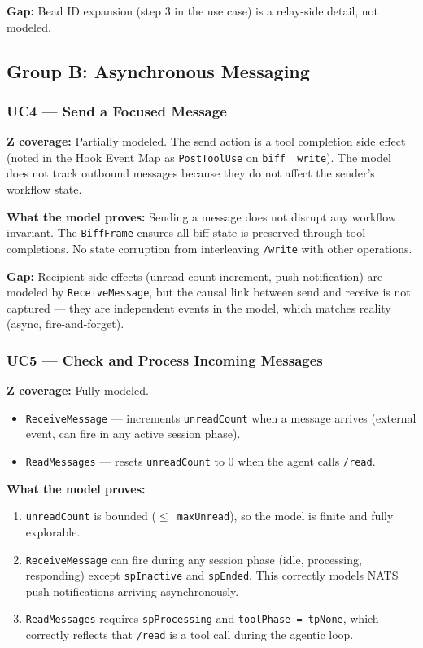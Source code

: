 \documentclass[a4paper,10pt,fleqn]{article}
\begin{document}
\textbf{Gap:} Bead ID expansion (step 3 in the use case) is a relay-side
detail, not modeled.

\subsection{Group B: Asynchronous Messaging}

\subsubsection{UC4 --- Send a Focused Message}

\textbf{Z coverage:} Partially modeled. The send action is a tool
completion side effect (noted in the Hook Event Map as
\texttt{PostToolUse} on \texttt{biff\_\_write}). The model does not
track outbound messages because they do not affect the sender's
workflow state.

\textbf{What the model proves:} Sending a message does not disrupt
any workflow invariant. The \texttt{BiffFrame} ensures all biff state
is preserved through tool completions. No state corruption from
interleaving \texttt{/write} with other operations.

\textbf{Gap:} Recipient-side effects (unread count increment, push
notification) are modeled by \texttt{ReceiveMessage}, but the causal
link between send and receive is not captured --- they are independent
events in the model, which matches reality (async, fire-and-forget).

\subsubsection{UC5 --- Check and Process Incoming Messages}

\textbf{Z coverage:} Fully modeled.

\begin{itemize}
  \item \texttt{ReceiveMessage} --- increments \texttt{unreadCount} when
    a message arrives (external event, can fire in any active session phase).
  \item \texttt{ReadMessages} --- resets \texttt{unreadCount} to 0 when
    the agent calls \texttt{/read}.
\end{itemize}

\textbf{What the model proves:}

\begin{enumerate}
  \item \texttt{unreadCount} is bounded (\texttt{$\leq$ maxUnread}), so
    the model is finite and fully explorable.
  \item \texttt{ReceiveMessage} can fire during any session phase
    (idle, processing, responding) except \texttt{spInactive} and
    \texttt{spEnded}. This correctly models NATS push notifications
    arriving asynchronously.
  \item \texttt{ReadMessages} requires \texttt{spProcessing} and
    \texttt{toolPhase = tpNone}, which correctly reflects that \texttt{/read}
    is a tool call during the agentic loop.
\end{enumerate}
\end{document}
